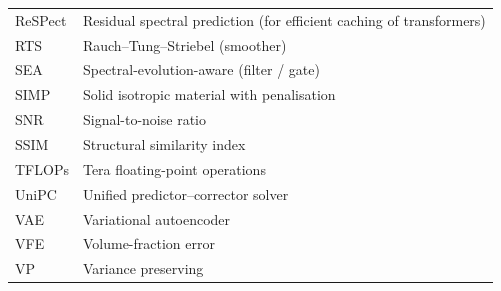 {\begin{longtable}{@{}ll@{}}
  ReSPect & Residual spectral prediction (for efficient caching of transformers) \\
  RTS & Rauch--Tung--Striebel (smoother) \\
  SEA & Spectral-evolution-aware (filter / gate) \\
  SIMP & Solid isotropic material with penalisation \\
  SNR & Signal-to-noise ratio \\
  SSIM & Structural similarity index \\
  TFLOPs & Tera floating-point operations \\
  UniPC & Unified predictor--corrector solver \\
  VAE & Variational autoencoder \\
  VFE & Volume-fraction error \\
  VP & Variance preserving \\
\end{longtable}}
